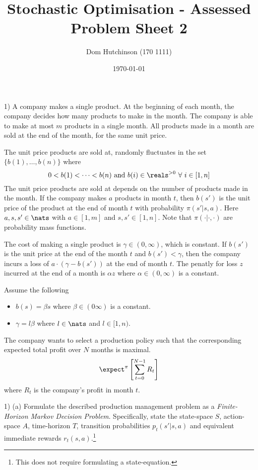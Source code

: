 \documentclass[11pt,a4paper]{article}
\begin{document}
\questionsfalse

\title{Stochastic Optimisation - Assessed Problem Sheet 2}
\author{Dom Hutchinson (170 1111)}
\date{\today}
\maketitle


\begin{question}{1)}
  A company makes a single product. At the beginning of each month, the company decides how many products to make in the month. The company is able to make at most $m$ products in a single month. All products made in a month are sold at the end of the month, for the same unit price.
  \par The unit price products are sold at, randomly fluctuates in the set $\{b(1),\dots,b(n)\}$ where
  \[ 0<b(1)<\dots<b(n)\text{ and }b(i)\in\reals^{>0}\ \forall\ i\in[1,n] \]
  The unit price products are sold at depends on the number of products made in the month. If the company makes $a$ products in month $t$, then $b(s')$ is the unit price of the product at the end of month $t$ with probability $\pi(s'|s,a)$. Here $a,s,s'\in\nats$ with $a\in[1,m]$ and $s,s'\in[1,n]$. Note that $\pi(\cdot|\cdot,\cdot)$ are probability mass functions.
  \par The cost of making a single product is $\gamma\in(0,\infty)$, which is constant. If $b(s')$ is the unit price at the end of the month $t$ and $b(s')<\gamma$, then the company incurs a loss of $a\cdot(\gamma-b(s'))$ at the end of month $t$. The penatly for loss $z$ incurred at the end of a month is $\alpha z$ where $\alpha\in(0,\infty)$ is a constant.
  \par Assume the following
  \begin{itemize}
    \item $b(s)=\beta s$ where $\beta\in(0\infty)$ is a constant.
    \item $\gamma=l\beta$ where $l\in\nats$ and $l\in[1,n)$.
  \end{itemize}
  The company wants to select a production policy such that the corresponding expected total profit over $N$ months is maximal.
  \[ \expect^\pi\left[\sum_{t=0}^{N-1}R_t\right] \]
  where $R_t$ is the company's profit in month $t$.
\end{question}

\begin{question}{1) (a)}
  Formulate the described production management problem as a \textit{Finite-Horizon Markov Decision Problem}. Specifically, state the state-space $S$, action-space $A$, time-horizon $T$, transition probabilities $p_t(s'|s,a)$ and equivalent immediate rewards $r_t(s,a)$.\footnote{This does not require formulating a state-equation.}
\end{question}
\end{document}
